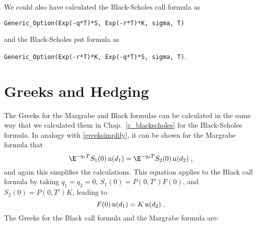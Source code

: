 \noindent
We could also have calculated the Black-Scholes call formula as
\small
\begin{center}
\verb!Generic_Option(Exp(-q*T)*S, Exp(-r*T)*K, sigma, T)!
\end{center}
\normalsize
and the Black-Scholes put formula as
\small
\begin{center}
\verb!Generic_Option(Exp(-r*T)*K, Exp(-q*T)*S, sigma, T)!.
\end{center}
\normalsize


\section{Greeks and Hedging}\label{s_forwardhedging}

The Greeks for the Margrabe and Black formulas can be calculated in the same way that we calculated them in Chap.~\ref{c_blackscholes} for the Black-Scholes formula.  In analogy with \eqref{greeksimplify}, it can be shown for the Margrabe formula that
$$\E^{-q_1T}S_1(0)\nd(d_1) = \E^{-q_2T}S_2(0)\nd(d_2)\; ,$$
and again this simplifies the calculations.  This equation applies to the Black call formula by taking $q_1=q_2=0$, $S_1(0)=P(0,T')F(0)$, and $S_2(0)=P(0,T')K$, leading to
$$F(0)\operatorname{n}(d_1) = K\operatorname{n}(d_2)\; .$$
The Greeks for the Black call formula and the Margrabe formula are: 
\small
